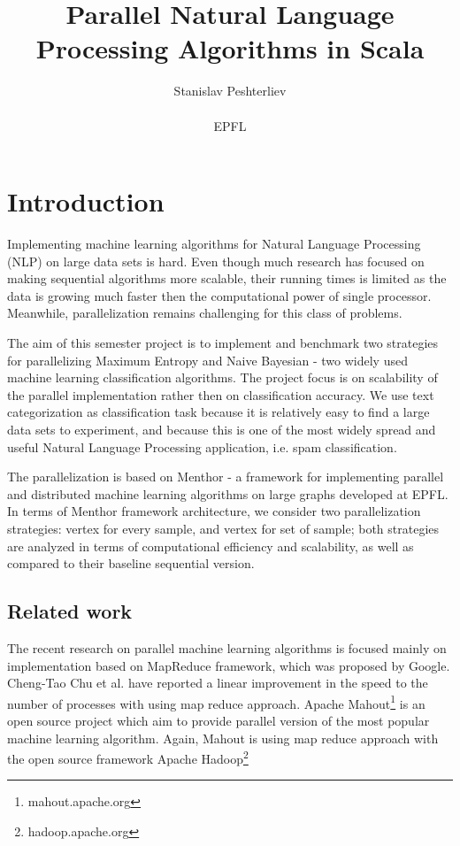 \documentclass{report}
\author{Stanislav Peshterliev \\ \\ EPFL}
\title{Parallel Natural Language Processing Algorithms in Scala}
\begin{document}
\maketitle

\tableofcontents

\chapter{Introduction}

Implementing machine learning algorithms for Natural Language Processing (NLP) on large data sets is hard.  Even though much research has focused on making sequential algorithms more scalable, their running times is limited as the data is growing much faster then the computational power of single processor. Meanwhile, parallelization remains challenging for this class of problems. 

The aim of this semester project is to implement and benchmark two strategies for parallelizing Maximum Entropy\cite{berger_a1-etal:1996a} and Naive Bayesian\cite{Rennie03} - two widely used machine learning classification algorithms.  The project focus is on scalability of the parallel implementation rather then on classification accuracy. We use text categorization as classification task because it is relatively easy to find a large data sets to experiment, and  because this is one of the most widely spread and useful Natural Language Processing application, i.e. spam classification.

The parallelization is based on Menthor\cite{oai:infoscience.epfl.ch:165111} - a framework for implementing parallel and distributed machine learning algorithms on large graphs developed at EPFL. In terms of Menthor framework architecture, we consider two parallelization strategies: vertex for every sample, and vertex for set of sample; both strategies are analyzed in terms of computational efficiency and scalability, as well as compared to their baseline sequential version.

\section{Related work}

The recent research on parallel machine learning algorithms is focused mainly on implementation based on MapReduce\cite{Dean:2008:MSD:1327452.1327492} framework, which was proposed by Google. Cheng-Tao Chu et al. have reported a linear improvement in the speed to the number of processes \cite{conf/nips/ChuKLYBNO06} with using map reduce approach. Apache Mahout\footnote{mahout.apache.org} is an open source project which aim to provide parallel version of the most popular machine learning algorithm. Again, Mahout is using map reduce approach with the open source framework Apache Hadoop\footnote{hadoop.apache.org}
\end{document}
